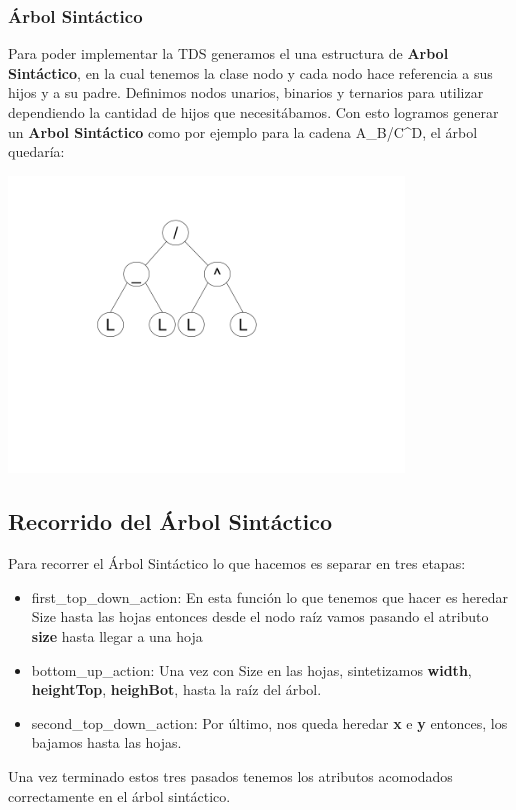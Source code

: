 \subsubsection{\'Arbol Sint\'actico}
Para poder implementar la TDS generamos el una estructura de \textbf{Arbol Sint\'actico}, en la cual tenemos la clase nodo y cada nodo hace referencia a sus hijos y a su padre. Definimos nodos unarios, binarios y ternarios para utilizar dependiendo la cantidad de hijos que necesit\'abamos.
Con esto logramos generar un \textbf{Arbol Sint\'actico} como por ejemplo para la cadena A\_B/C\^{}D, el \'arbol quedar\'ia:
\begin{center}
\includegraphics[width=10.5cm]{arbols}
\end{center}

\newpage

\subsection{Recorrido del \'Arbol Sint\'actico}
Para recorrer el \'Arbol Sint\'actico lo que hacemos es separar en tres etapas:

\begin{itemize}
  \item first\_top\_down\_action: En esta funci\'on lo que tenemos que hacer es heredar Size hasta las hojas entonces desde el nodo ra\'iz vamos pasando el atributo \textbf{size} hasta llegar a una hoja
  \item bottom\_up\_action: Una vez con Size en las hojas, sintetizamos \textbf{width}, \textbf{heightTop}, \textbf{heighBot}, hasta la ra\'iz del \'arbol.
  \item second\_top\_down\_action: Por \'ultimo, nos queda heredar \textbf{x} e \textbf{y} entonces, los bajamos hasta las hojas.
\end{itemize}

Una vez terminado estos tres pasados tenemos los atributos acomodados correctamente en el \'arbol sint\'actico.
